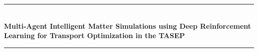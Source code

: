 \graphicspath{{img/}}
\lhead[\fancyplain{}{\thepage}]{\fancyplain{}{\rightmark}}
\rhead[\fancyplain{}{\leftmark}]{\fancyplain{}{\thepage}}
\cfoot{}
\newcommand{\theTitle}{Multi-Agent Intelligent Matter Simulations using Deep Reinforcement Learning for Transport Optimization in the TASEP}
\begin{titlepage}
    \begin{center}
        \vspace*{0.65cm}
        \huge
        \rule{\linewidth}{0.3ex}\\
        \vspace*{0.3cm}
        \hspace*{-0.73cm}
        \textbf{\theTitle}\\
        \rule{\linewidth}{0.3ex}
        \vspace*{2.2cm}


\end{center}
\end{titlepage}
